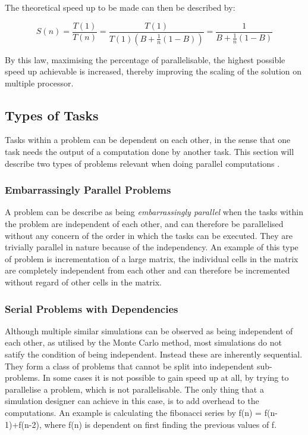 The theoretical speed up to be made can then be described by:

\begin{equation}
  S(n) = \frac{T(1)}{T(n)} = \frac{T(1)}{T(1)(B + \frac{1}{n} (1 - B))} = \frac{1}{B + \frac{1}{n} (1 - B)}
\end{equation}

By this law, maximising the percentage of parallelisable, the highest possible speed up achievable is increased, thereby improving the scaling of the solution on multiple processor.

\subsection{Types of Tasks}\label{top}

Tasks within a problem can be dependent on each other, in the sense that one task needs the output of a computation done by another task. This section will describe two types of problems relevant when doing parallel computations \cite{gribblelab,compLLNL}.

\subsubsection{Embarrassingly Parallel Problems}
A problem can be describe as being \emph{embarrassingly parallel} when the tasks within the problem are independent of each other, and can therefore be parallelised without any concern of the order in which the tasks can be executed. They are trivially parallel in nature because of the independency. An example of this type of problem is incrementation of a large matrix, the individual cells in the matrix are completely independent from each other and can therefore be incremented without regard of other cells in the matrix.

\subsubsection{Serial Problems with Dependencies}
Although multiple similar simulations can be observed as being independent of each other, as utilised by the Monte Carlo method, most simulations do not satify the condition of being independent. Instead these are inherently sequential. They form a class of problems that cannot be split into independent sub-problems. In some cases it is not possible to gain speed up at all, by trying to parallelise a problem, which is not parallelisable. The only thing that a simulation designer can achieve in this case, is to add overhead to the computations. An example is calculating the fibonacci series by f(n) = f(n-1)+f(n-2), where f(n) is dependent on first finding the previous values of f.

